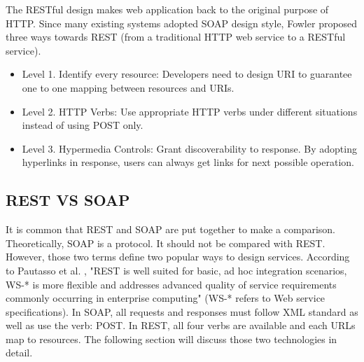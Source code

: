 \documentclass{Nan_Thesis}
\begin{document}
The RESTful design makes web application back to the original purpose of HTTP. Since many existing systems adopted SOAP design style, Fowler \cite{fowler2010richardson} proposed three ways towards REST (from a traditional HTTP web service to a RESTful service).

\begin{itemize}
  \item Level 1. Identify every resource: Developers need to design URI to guarantee one to one mapping between resources and URIs.
  \item Level 2. HTTP Verbs: Use appropriate HTTP verbs under different situations instead of using POST only. 
  \item Level 3. Hypermedia Controls: Grant discoverability to response. By adopting hyperlinks in response, users can always get links for next possible operation.
\end{itemize} 

\subsection{REST VS SOAP}
It is common that REST and SOAP are put together to make a comparison.  Theoretically, SOAP is a protocol. It should not be compared with REST. However, those two terms define two popular ways to design services. According to Pautasso et al. \cite{pautasso2008restful}, "REST is well suited for basic, ad hoc integration scenarios,
WS-* is more flexible and addresses advanced quality of service requirements commonly occurring in enterprise computing" (WS-* refers to Web service specifications).
In SOAP, all requests and responses must follow XML standard as well as use the verb: POST. In REST, all four verbs are available and each URLs map to resources. The following section will discuss those two technologies in detail.
\end{document}

